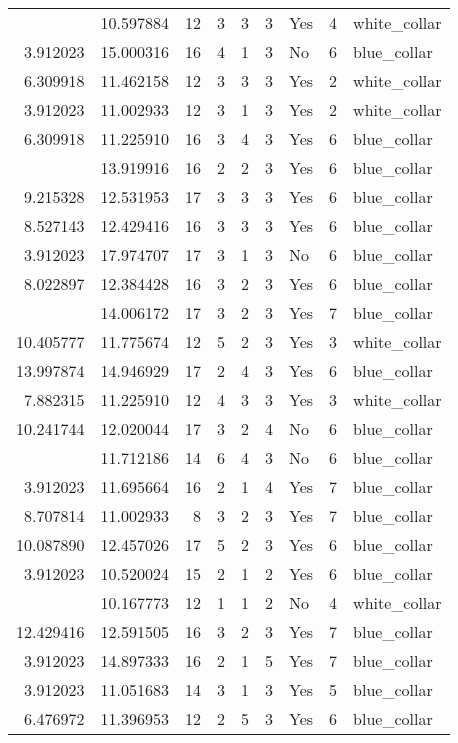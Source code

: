 \documentclass[
]{article}
\begin{document}
\begin{longtable}[t]{rrrrrllrl}
\addlinespace
9.619133 & 10.597884 & 12 & 3 & 3 & 3 & Yes & 4 & white\_collar\\
3.912023 & 15.000316 & 16 & 4 & 1 & 3 & No & 6 & blue\_collar\\
6.309918 & 11.462158 & 12 & 3 & 3 & 3 & Yes & 2 & white\_collar\\
3.912023 & 11.002933 & 12 & 3 & 1 & 3 & Yes & 2 & white\_collar\\
6.309918 & 11.225910 & 16 & 3 & 4 & 3 & Yes & 6 & blue\_collar\\
\addlinespace
9.905984 & 13.919916 & 16 & 2 & 2 & 3 & Yes & 6 & blue\_collar\\
9.215328 & 12.531953 & 17 & 3 & 3 & 3 & Yes & 6 & blue\_collar\\
8.527143 & 12.429416 & 16 & 3 & 3 & 3 & Yes & 6 & blue\_collar\\
3.912023 & 17.974707 & 17 & 3 & 1 & 3 & No & 6 & blue\_collar\\
8.022897 & 12.384428 & 16 & 3 & 2 & 3 & Yes & 6 & blue\_collar\\
\addlinespace
11.513425 & 14.006172 & 17 & 3 & 2 & 3 & Yes & 7 & blue\_collar\\
10.405777 & 11.775674 & 12 & 5 & 2 & 3 & Yes & 3 & white\_collar\\
13.997874 & 14.946929 & 17 & 2 & 4 & 3 & Yes & 6 & blue\_collar\\
7.882315 & 11.225910 & 12 & 4 & 3 & 3 & Yes & 3 & white\_collar\\
10.241744 & 12.020044 & 17 & 3 & 2 & 4 & No & 6 & blue\_collar\\
\addlinespace
6.476972 & 11.712186 & 14 & 6 & 4 & 3 & No & 6 & blue\_collar\\
3.912023 & 11.695664 & 16 & 2 & 1 & 4 & Yes & 7 & blue\_collar\\
8.707814 & 11.002933 & 8 & 3 & 2 & 3 & Yes & 7 & blue\_collar\\
10.087890 & 12.457026 & 17 & 5 & 2 & 3 & Yes & 6 & blue\_collar\\
3.912023 & 10.520024 & 15 & 2 & 1 & 2 & Yes & 6 & blue\_collar\\
\addlinespace
3.912023 & 10.167773 & 12 & 1 & 1 & 2 & No & 4 & white\_collar\\
12.429416 & 12.591505 & 16 & 3 & 2 & 3 & Yes & 7 & blue\_collar\\
3.912023 & 14.897333 & 16 & 2 & 1 & 5 & Yes & 7 & blue\_collar\\
3.912023 & 11.051683 & 14 & 3 & 1 & 3 & Yes & 5 & blue\_collar\\
6.476972 & 11.396953 & 12 & 2 & 5 & 3 & Yes & 6 & blue\_collar\\

\end{longtable}
\end{document}
